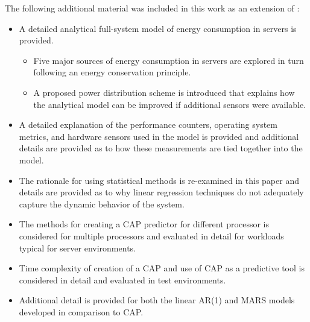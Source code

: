 \documentclass[acmtaco]{acmtrans2m}
\begin{document}
The following additional material was included in this work as an
extension of \cite{Lewis2010}:
\begin{itemize}
\item A detailed analytical full-system model of energy consumption in
  servers is provided.
  \begin{itemize}
  \item Five major sources of energy consumption in servers are
    explored in turn following an energy conservation principle.
  \item A proposed power distribution scheme is introduced that explains
    how the analytical model can be improved if additional sensors were
    available.
  \end{itemize}
\item A detailed explanation of the performance counters, operating
  system metrics, and hardware sensors used in the model is provided and
  additional details are provided as to how these measurements are tied
  together into the model.
\item The rationale for using statistical methods is re-examined in this
  paper and details are provided as to why linear regression techniques
  do not adequately capture the dynamic behavior of the system.
\item The methods for creating a CAP predictor for different processor
  is considered for multiple processors and evaluated in detail for
  workloads typical for server environments.
\item Time complexity of creation of a CAP and use of CAP as a
  predictive tool is considered in detail and evaluated in test
  environments. 
\item Additional detail is provided for both the linear AR(1) and MARS
  models developed in comparison to CAP.
\end{itemize}
\end{document}

